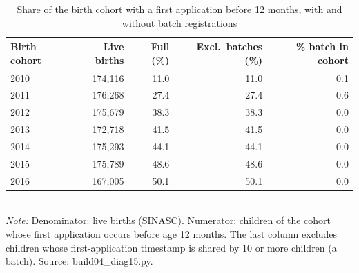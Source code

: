 \begin{table}[htbp]\centering
\caption{Share of the birth cohort with a first application before 12 months, with and without batch registrations}
\label{tab:D15_B4_coorte_sem_lote}
\small
\begin{tabular}{lrrrr}
\toprule
Birth cohort & Live births & Full (\%) & Excl.\ batches (\%) & \% batch in cohort \\
\midrule
2010 & 174,116 & 11.0 & 11.0 & 0.1 \\
2011 & 176,268 & 27.4 & 27.4 & 0.6 \\
2012 & 175,679 & 38.3 & 38.3 & 0.0 \\
2013 & 172,718 & 41.5 & 41.5 & 0.0 \\
2014 & 175,293 & 44.1 & 44.1 & 0.0 \\
2015 & 175,789 & 48.6 & 48.6 & 0.0 \\
2016 & 167,005 & 50.1 & 50.1 & 0.0 \\
\bottomrule
\end{tabular}
\\[3pt]{\footnotesize \textit{Note:} Denominator: live births (SINASC). Numerator: children of the cohort whose first application occurs before age 12 months. The last column excludes children whose first-application timestamp is shared by 10 or more children (a batch). Source: build04\_diag15.py.}
\end{table}
